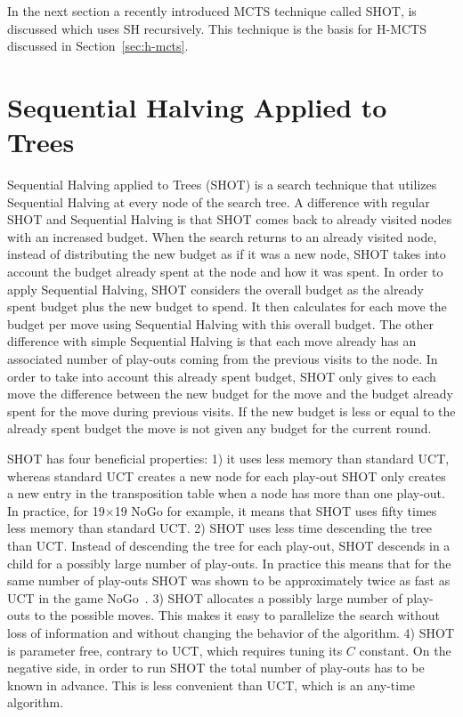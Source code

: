 \documentclass[a4paper]{llncs}
\begin{document}
In the next section a recently introduced MCTS technique called SHOT, is discussed which uses SH recursively. This technique is the basis for H-MCTS discussed in Section~\ref{sec:h-mcts}.

\section{Sequential Halving Applied to Trees}
\label{sec:shot}

Sequential Halving applied to Trees (SHOT) \cite{Cazenave14SHOT} is a search technique that utilizes Sequential Halving at every node of the search tree. A difference with regular SHOT and Sequential Halving is that SHOT comes back to already visited nodes with an increased budget. When the search returns to an already visited node, instead of distributing the new
budget as if it was a new node, SHOT takes into account the budget
already spent at the node and how it was spent. In order to apply
Sequential Halving, SHOT considers the overall budget as the already
spent budget plus the new budget to spend. It then calculates for each
move the budget per move using Sequential Halving with this overall
budget. The other difference with simple Sequential Halving is that
each move already has an associated number of play-outs coming from the
previous visits to the node. In order to take into account this
already spent budget, SHOT only gives to each move the difference
between the new budget for the move and the budget already spent for
the move during previous visits. If the new budget is less or equal to
the already spent budget the move is not given any budget for the
current round.

SHOT has four beneficial properties: 1) it uses less memory than standard UCT, whereas standard UCT creates a new node for each play-out SHOT only creates a new entry in the transposition table when a node has more than one play-out. In practice, for 19$\times$19 NoGo for example, it means that SHOT uses fifty times less memory than standard UCT. 2) SHOT uses less time descending the tree than UCT. Instead of descending the tree for each play-out, SHOT descends in a child for a possibly large number of play-outs. In practice this means that for the same number of play-outs SHOT was shown to be approximately twice as fast as UCT in the game NoGo~\cite{Cazenave14SHOT}. 3) SHOT allocates a possibly large number of play-outs to the possible moves. This makes it easy to parallelize the search without loss of information and without changing the behavior of the algorithm. 4) SHOT is parameter free, contrary to UCT, which requires tuning its $C$ constant. On the negative side, in order to run SHOT the total number of play-outs has to be known in advance. This is less convenient than UCT, which is an any-time algorithm.
\end{document}
